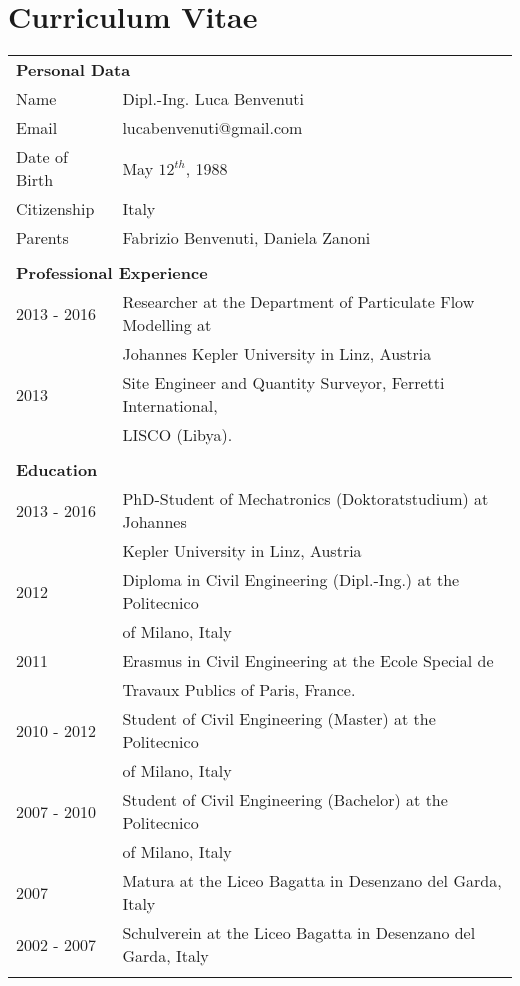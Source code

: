 \chapter*{Curriculum Vitae}

\setlength\extrarowheight{5pt}

\begin{longtable}[t]{ll}
	\multicolumn{2}{l}{\textbf{\Large Personal Data}} \\
	Name & Dipl.-Ing. Luca Benvenuti \\
	Email & lucabenvenuti@gmail.com \\
	Date of Birth & May $12^{th}$, 1988 \\
	Citizenship & Italy \\
	Parents & Fabrizio Benvenuti, Daniela Zanoni \\
	\vspace*{1ex} \\ 
	\multicolumn{2}{l}{\textbf{\Large Professional Experience}} \\
	2013 - 2016 & Researcher at the Department of Particulate Flow Modelling at \\
				&		Johannes Kepler University in Linz, Austria \\
	2013 		& Site Engineer and Quantity Surveyor, Ferretti International, \\
		 		& LISCO (Libya). \\
	\vspace*{1ex} \\
	\multicolumn{2}{l}{\textbf{\Large Education}} \\
	2013 - 2016 & PhD-Student of Mechatronics (Doktoratstudium) at Johannes \\
				& Kepler University in Linz, Austria \\
	2012 		& Diploma in Civil Engineering (Dipl.-Ing.) at the Politecnico \\
				& of Milano, Italy \\
	2011		& Erasmus in Civil Engineering at the Ecole Special de \\
				& Travaux Publics of Paris, France. \\
	2010 - 2012 & Student of Civil Engineering (Master) at the Politecnico \\
				& of Milano, Italy \\
	2007 - 2010 & Student of Civil Engineering (Bachelor) at the Politecnico \\
				& of Milano, Italy \\				
	2007 		& Matura at the Liceo Bagatta in Desenzano del Garda, Italy \\
	2002 - 2007 & Schulverein at the Liceo Bagatta in Desenzano del Garda, Italy \\	
	\vspace*{1ex} \\
\end{longtable}
